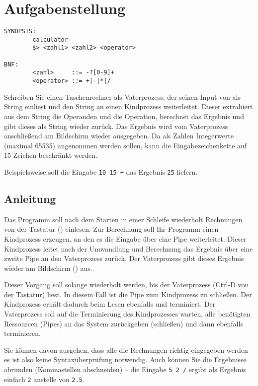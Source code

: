 




\section*{Aufgabenstellung}

\begin{verbatim}
SYNOPSIS:
        calculator
        $> <zahl1> <zahl2> <operator>

BNF:
        <zahl>     ::= -?[0-9]+
        <operator> ::= +|-|*|/

\end{verbatim}

Schreiben Sie einen Taschenrechner als Vaterprozess, der seinen Input
von  als String einliest und den String an einen
Kindprozess weiterleitet. Dieser extrahiert aus dem String die
Operanden und die Operation, berechnet das Ergebnis und gibt dieses
als String wieder zurück. Das Ergebnis wird vom Vaterprozess
anschließend am Bildschirm wieder ausgegeben. Da als Zahlen
Integerwerte (maximal 65535) angenommen werden sollen, kann die
Eingabezeichenkette auf 15 Zeichen beschränkt werden.


Beispielsweise soll die Eingabe \verb_10 15 +_ das Ergebnis \verb_25_
liefern.

\subsection*{Anleitung}

Das Programm soll nach dem Starten in einer Schleife wiederholt
Rechnungen von der Tastatur () einlesen. Zur
Berechnung soll Ihr Programm einen Kindprozess erzeugen, an den
es die Eingabe über eine Pipe weiterleitet. Dieser Kindprozess
leitet nach der Umwandlung und Berechnung das Ergebnis über eine
zweite Pipe an den Vaterprozess zurück. Der Vaterprozess
gibt dieses Ergebnis wieder am Bildschirm () aus.


Dieser Vorgang soll solange wiederholt werden, bis der Vaterprozess
 (Ctrl-D von der Tastatur) liest. In diesem Fall
ist die Pipe zum Kindprozess zu schließen. Der Kindprozess erhält
dadurch beim Lesen ebenfalls  und terminiert. Der
Vaterprozess soll auf die Terminierung des Kindprozesses warten, alle
benötigten Ressourcen (Pipes) an das System zurückgeben (schließen)
und dann ebenfalls terminieren.


Sie können davon ausgehen, dass alle die Rechnungen richtig eingegeben
werden – es ist also keine Syntaxüberprüfung notwendig. Auch können
Sie die Ergebnisse abrunden (Kommastellen abschneiden) – die Eingabe
\verb_5 2 /_ ergibt als Ergebnis einfach \verb_2_ anstelle von
\verb_2.5_.

\osueguidelinestwo


